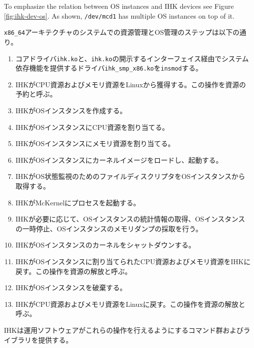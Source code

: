 \documentclass[twoside,11pt,fleqn]{book}
\begin{document}
To emphasize the relation
between OS instances and IHK devices see Figure \ref{fig:ihk-dev-os}.
As shown, \texttt{/dev/mcd1} has multiple OS instances on top of it.


\texttt{x86\_64}アーキテクチャのシステムでの資源管理とOS管理のステップは以下の通り。
\begin{enumerate}
\item コアドライバ\texttt{ihk.ko}と、\texttt{ihk.ko}の開示するインターフェイス経由でシステム依存機能を提供するドライバ\texttt{ihk\_smp\_x86.ko}を\texttt{insmod}する。
\item IHKがCPU資源およびメモリ資源をLinuxから獲得する。この操作を資源の予約と呼ぶ。
\item IHKがOSインスタンスを作成する。
\item IHKがOSインスタンスにCPU資源を割り当てる。
\item IHKがOSインスタンスにメモリ資源を割り当てる。
\item IHKがOSインスタンスにカーネルイメージをロードし、起動する。
\item IHKがOS状態監視のためのファイルディスクリプタをOSインスタンスから取得する。
\item IHKがMcKernelにプロセスを起動する。
\item IHKが必要に応じて、OSインスタンスの統計情報の取得、OSインスタンスの一時停止、OSインスタンスのメモリダンプの採取を行う。
\item IHKがOSインスタンスのカーネルをシャットダウンする。
\item IHKがOSインスタンスに割り当てられたCPU資源およびメモリ資源をIHKに戻す。この操作を資源の解放と呼ぶ。
\item IHKがOSインスタンスを破棄する。
\item IHKがCPU資源およびメモリ資源をLinuxに戻す。この操作を資源の解放と呼ぶ。
\end{enumerate}
IHKは運用ソフトウェアがこれらの操作を行えるようにするコマンド群およびライブラリを提供する。
\end{document}
